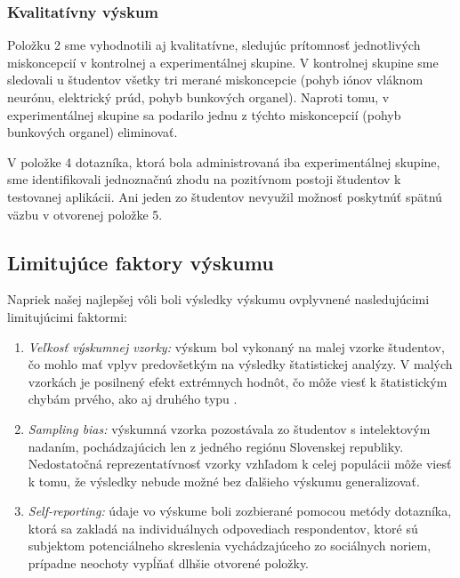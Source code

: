 \subsubsection{Kvalitatívny výskum}
Položku 2 sme vyhodnotili aj kvalitatívne, sledujúc prítomnosť jednotlivých miskoncepcií v kontrolnej a experimentálnej skupine. V kontrolnej skupine sme sledovali u študentov všetky tri merané miskoncepcie 
(pohyb iónov vláknom neurónu, elektrický prúd, pohyb bunkových organel). Naproti tomu, v experimentálnej skupine sa podarilo jednu z týchto miskoncepcií (pohyb bunkových organel) eliminovať.

V položke 4 dotazníka, ktorá bola administrovaná iba experimentálnej skupine, sme identifikovali jednoznačnú zhodu na pozitívnom postoji študentov k testovanej aplikácii. Ani jeden zo študentov nevyužil možnosť poskytnúť
spätnú väzbu v otvorenej položke 5.

\newpage
\subsection{Limitujúce faktory výskumu}
Napriek našej najlepšej vôli boli výsledky výskumu ovplyvnené nasledujúcimi limitujúcimi faktormi:

\begin{enumerate}
  \item \emph{Veľkosť výskumnej vzorky:} výskum bol vykonaný na malej vzorke študentov, čo mohlo mať vplyv predovšetkým na výsledky štatistickej analýzy. V malých vzorkách je posilnený efekt extrémnych hodnôt, 
  čo môže viesť k štatistickým chybám prvého, ako aj druhého typu \cite{komendaAnalyzaNahodnehoPedagogickem1981}.
  \item \emph{Sampling bias:} výskumná vzorka pozostávala zo študentov s intelektovým nadaním, pochádzajúcich len z jedného regiónu Slovenskej republiky. Nedostatočná reprezentatívnosť vzorky vzhľadom k celej populácii 
  môže viesť k tomu, že výsledky nebude možné bez ďalšieho výskumu generalizovať.
  \item \emph{Self-reporting:} údaje vo výskume boli zozbierané pomocou metódy dotazníka, ktorá sa zakladá na individuálnych odpovediach respondentov, ktoré sú subjektom potenciálneho skreslenia vychádzajúceho
  zo sociálnych noriem, prípadne neochoty vypĺňať dlhšie otvorené položky.
\end{enumerate}

